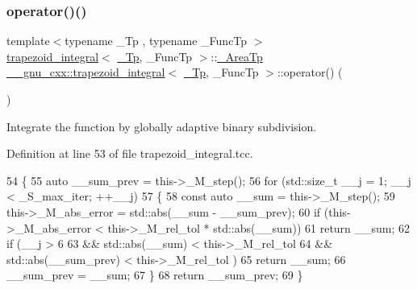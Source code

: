 \subsubsection{\texorpdfstring{operator()()}{operator()()}\hspace{0.1cm}{\footnotesize\ttfamily [1/2]}}
{\footnotesize\ttfamily template$<$typename \+\_\+\+Tp , typename \+\_\+\+Func\+Tp $>$ \\
\hyperlink{class____gnu__cxx_1_1trapezoid__integral}{trapezoid\+\_\+integral}$<$ \hyperlink{namespace____gnu__cxx_a3b19a9c800ca194374ef9172290f7d79}{\+\_\+\+Tp}, \+\_\+\+Func\+Tp $>$\+::\hyperlink{class____gnu__cxx_1_1trapezoid__integral_a41c7c672204caf0e1b842c3664aca85f}{\+\_\+\+Area\+Tp} \hyperlink{class____gnu__cxx_1_1trapezoid__integral}{\+\_\+\+\_\+gnu\+\_\+cxx\+::trapezoid\+\_\+integral}$<$ \hyperlink{namespace____gnu__cxx_a3b19a9c800ca194374ef9172290f7d79}{\+\_\+\+Tp}, \+\_\+\+Func\+Tp $>$\+::operator() (\begin{DoxyParamCaption}{ }\end{DoxyParamCaption})}

Integrate the function by globally adaptive binary subdivision. 

Definition at line 53 of file trapezoid\+\_\+integral.\+tcc.


\begin{DoxyCode}
54     \{
55       \textcolor{keyword}{auto} \_\_sum\_prev = this->\_M\_step();
56       \textcolor{keywordflow}{for} (std::size\_t \_\_j = 1; \_\_j < \_S\_max\_iter; ++\_\_j)
57         \{
58           \textcolor{keyword}{const} \textcolor{keyword}{auto} \_\_sum = this->\_M\_step();
59           this->\_M\_abs\_error = std::abs(\_\_sum - \_\_sum\_prev);
60           \textcolor{keywordflow}{if} (this->\_M\_abs\_error < this->\_M\_rel\_tol * std::abs(\_\_sum))
61             \textcolor{keywordflow}{return} \_\_sum;
62           \textcolor{keywordflow}{if} (\_\_j > 6
63               && std::abs(\_\_sum) < this->\_M\_rel\_tol
64               && std::abs(\_\_sum\_prev) < this->\_M\_rel\_tol )
65             \textcolor{keywordflow}{return} \_\_sum;
66           \_\_sum\_prev = \_\_sum;
67         \}
68       \textcolor{keywordflow}{return} \_\_sum\_prev;
69     \}
\end{DoxyCode}
\mbox{\label{class____gnu__cxx_1_1trapezoid__integral_aa6bf7aa6b4dfae14bd9c26a267cd6d9f}} 
